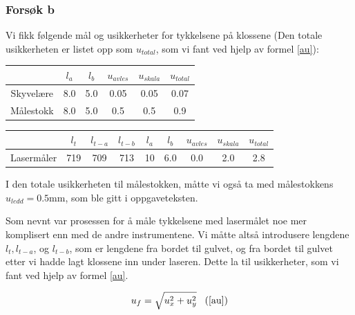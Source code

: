 \subsubsection*{Forsøk b}

Vi fikk følgende mål og usikkerheter for tykkelsene på klossene (Den totale usikkerheten er listet opp som $u_{total}$, som vi fant ved hjelp av formel \ref{au}):

\begin{center}
\begin{tabular}{ | c | c | c | c | c | c |}
    \hline
    & $l_a$ & $l_b$ & $u_{avles}$ & $u_{skala}$ & $u_{total}$\\
    \hline
     Skyvelære & 8.0  & 5.0  & 0.05 & 0.05 & 0.07\\
    \hline
     Målestokk & 8.0 & 5.0 & 0.5 & 0.5 & 0.9\\
     \hline
\end{tabular}
\label{table6}
\end{center}

\begin{center}
\begin{tabular}{ | c | c | c | c | c | c | c | c | c |}
    \hline
    & $l_t$ & $l_{t-a}$ & $l_{t-b}$ & $l_a$ & $l_b$ & $u_{avles}$ & $u_{skala}$ & $u_{total}$\\
    \hline
     Lasermåler & 719 & 709 & 713 & 10 & 6.0  & 0.0 & 2.0 & 2.8\\
    \hline
\end{tabular}
\label{table7}
\end{center}

I den totale usikkerheten til målestokken, måtte vi også ta med målestokkens $u_{ledd} = 0.5$mm, som ble gitt i oppgaveteksten.

Som nevnt var prosessen for å måle tykkelsene med lasermålet noe mer komplisert enn med de andre instrumentene. Vi måtte altså introdusere lengdene $l_t,l_{t-a}$, og $l_{t-b}$, som er lengdene fra bordet til gulvet, og fra bordet til gulvet etter vi hadde lagt klossene inn under laseren. Dette la til usikkerheter, som vi fant ved hjelp av formel \ref{au}.

\begin{align*}
    u_f = \sqrt{u_x^2 +u_y^2} \alignref{au}
\end{align*}

